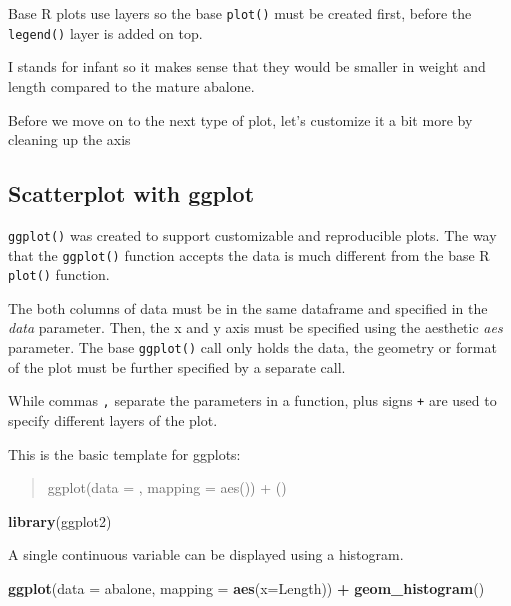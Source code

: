 \documentclass[
]{book}
\newenvironment{Shaded}{\begin{snugshade}}{\end{snugshade}}
\newcommand{\AttributeTok}[1]{\textcolor[rgb]{0.13,0.29,0.53}{#1}}
\newcommand{\FunctionTok}[1]{\textcolor[rgb]{0.13,0.29,0.53}{\textbf{#1}}}
\newcommand{\NormalTok}[1]{#1}
\newcommand{\SpecialCharTok}[1]{\textcolor[rgb]{0.81,0.36,0.00}{\textbf{#1}}}
\begin{document}
Base R plots use layers so the base \texttt{plot()} must be created first, before the \texttt{legend()} layer is added on top.

I stands for infant so it makes sense that they would be smaller in weight and length compared to the mature abalone.

Before we move on to the next type of plot, let's customize it a bit more by cleaning up the axis

\subsection{Scatterplot with ggplot}\label{scatterplot-with-ggplot}

\texttt{ggplot()} was created to support customizable and reproducible plots. The way that the \texttt{ggplot()} function accepts the data is much different from the base R \texttt{plot()} function.

The both columns of data must be in the same dataframe and specified in the \emph{data} parameter. Then, the x and y axis must be specified using the aesthetic \emph{aes} parameter. The base \texttt{ggplot()} call only holds the data, the geometry or format of the plot must be further specified by a separate call.

While commas \texttt{,} separate the parameters in a function, plus signs \texttt{+} are used to specify different layers of the plot.

This is the basic template for ggplots:

\begin{quote}
ggplot(data = , mapping = aes()) + ()
\end{quote}

\begin{Shaded}
\begin{Highlighting}[]
\FunctionTok{library}\NormalTok{(ggplot2)}
\end{Highlighting}
\end{Shaded}

A single continuous variable can be displayed using a histogram.

\begin{Shaded}
\begin{Highlighting}[]
\FunctionTok{ggplot}\NormalTok{(}\AttributeTok{data =}\NormalTok{ abalone, }\AttributeTok{mapping =} \FunctionTok{aes}\NormalTok{(}\AttributeTok{x=}\NormalTok{Length)) }\SpecialCharTok{+}
  \FunctionTok{geom\_histogram}\NormalTok{()}
\end{Highlighting}
\end{Shaded}
\end{document}
